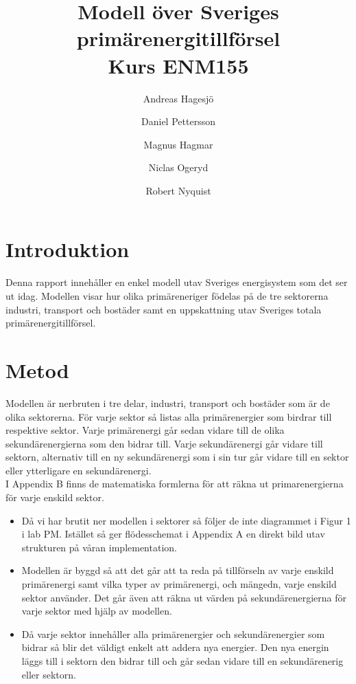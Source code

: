 \documentclass[a4paper,11pt,fleqn]{article}
\author{Andreas Hagesjö \and Daniel Pettersson \and
Magnus Hagmar \and Niclas Ogeryd \and Robert Nyquist}
\title{Modell över Sveriges primärenergitillförsel \\ Kurs ENM155}
\begin{document}
\maketitle
\newpage
{} 

\section{Introduktion}
Denna rapport innehåller en enkel modell utav Sveriges energisystem som det ser ut idag.
Modellen visar hur olika primäreneriger födelas på de tre sektorerna industri, transport och bostäder samt en uppskattning utav Sveriges totala primärenergitillförsel.


\section{Metod}
Modellen är nerbruten i tre delar, industri, transport och bostäder som är de olika sektorerna.
För varje sektor så listas alla primärenergier som birdrar till respektive sektor. Varje primärenergi går sedan vidare till de olika sekundärenergierna som den bidrar till. Varje sekundärenergi går vidare till sektorn, alternativ till en ny sekundärenergi som i sin tur går vidare till en sektor eller ytterligare en sekundärenergi. \\
I Appendix B finns de matematiska formlerna för att räkna ut primarenergierna för varje enskild sektor.


\begin{itemize}
\item Då vi har brutit ner modellen i sektorer så följer de inte diagrammet i Figur 1 i lab PM.
Istället så ger flödesschemat i Appendix A en direkt bild utav strukturen på våran implementation.


\item Modellen är byggd så att det går att ta reda på tillförseln av varje enskild primärenergi samt vilka typer av primärenergi, och mängedn, varje enskild sektor använder.
Det går även att räkna ut värden på sekundärenergierna för varje sektor med hjälp av modellen.

\item Då varje sektor innehåller alla primärenergier och sekundärenergier som bidrar så blir det väldigt enkelt att addera nya energier.
Den nya energin läggs till i sektorn den bidrar till och går sedan vidare till en sekundärenerig eller sektorn.
\end{itemize}
\end{document}
